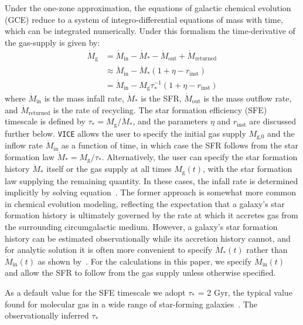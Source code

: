 Under the one-zone approximation,
the equations of galactic chemical evolution (GCE)
reduce to a system of integro-differential equations of mass with time, which 
can be integrated numerically. Under this formalism the time-derivative of the 
gas-supply is given by: 
\begin{subequations}\begin{align} 
\label{bursts:eq:mdot_gas} 
\dot{M}_\text{g} &= \dot{M}_\text{in} - \dot{M}_* - \dot{M}_\text{out} + 
\dot{M}_\text{returned} \\ 
&\approx \dot{M}_\text{in} - \dot{M}_*(1 + \eta - r_\text{inst}) \\ 
&= \dot{M}_\text{in} - M_\text{g}\tau_*^{-1}(1 + \eta - r_\text{inst}) 
\end{align}\end{subequations} 
where $\dot{M}_\text{in}$ is the mass infall rate, $\dot{M}_*$ is the SFR, 
$\dot{M}_\text{out}$ is the mass outflow rate, and $\dot{M}_\text{returned}$ 
is the rate of recycling. The star formation efficiency (SFE) timescale is 
defined by $\tau_* = M_\text{g}/\dot{M}_*$, and the parameters $\eta$ and 
$r_\text{inst}$ are discussed further below. 
\texttt{VICE} allows the user to specify the initial gas supply $M_\text{g,0}$ 
and the inflow rate $\dot{M}_\text{in}$ as a function of time, in which case 
the SFR follows from the star formation law $\dot{M}_* = M_\text{g}/\tau_*$. 
Alternatively, the user can specify the star formation history $\dot{M}_*$ 
itself or the gas supply at all times $M_\text{g}(t)$, with the star formation 
law supplying the remaining quantity. In these cases, the infall rate is 
determined implicitly by solving equation~. The former 
approach is somewhat more common in chemical evolution modeling, reflecting 
the expectation that a galaxy's star formation history is ultimately governed 
by the rate at which it accretes gas from the surrounding circumgalactic 
medium. However, a galaxy's star formation history can be estimated 
observationally while its accretion history cannot, and for analytic solution 
it is often more convenient to specify $\dot{M}_*(t)$ rather than 
$\dot{M}_\text{in}(t)$ as shown by~\citet{Weinberg2017b}. For the 
calculations in this paper, we specify $\dot{M}_\text{in}(t)$ and allow the 
SFR to follow from the gas supply unless otherwise specified. 
\par 
As a default value for the SFE timescale we adopt 
$\tau_*$ = 2 Gyr, the typical value found for molecular gas in a wide range of 
star-forming galaxies~\citep{Leroy2008}. The observationally inferred $\tau_*$ 
